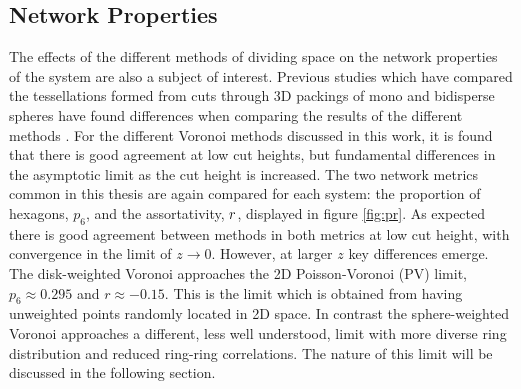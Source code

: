 \subsection{Network Properties}

The effects of the different methods of dividing space on the network properties of the system are also a subject of interest.
Previous studies which have compared the tessellations formed from cuts through 3D packings of mono and bidisperse spheres have found differences when comparing the results of the different methods \cite{Oger2000,Gervois2004}.
For the different Voronoi methods discussed in this work, it is found that there is good agreement at low cut heights, but fundamental differences in the asymptotic limit as the cut height is increased.
The two network metrics common in this thesis are again compared for each system: the proportion of hexagons, $p_6$, and the assortativity, $r$, displayed in figure \ref{fig:pr}.
As expected there is good agreement between methods in both metrics at low cut height, with convergence in the limit of $z\rightarrow 0$.
However, at larger $z$ key differences emerge. 
The disk\--weighted Voronoi approaches the 2D Poisson\--Voronoi (PV) limit, $p_6\approx0.295$ and $r\approx -0.15$.
This is the limit which is obtained from having unweighted points randomly located in 2D space.
In contrast the sphere\--weighted Voronoi approaches a different, less well understood, limit with more diverse ring distribution and reduced ring\--ring correlations. The nature of this limit will be discussed in the following section.


